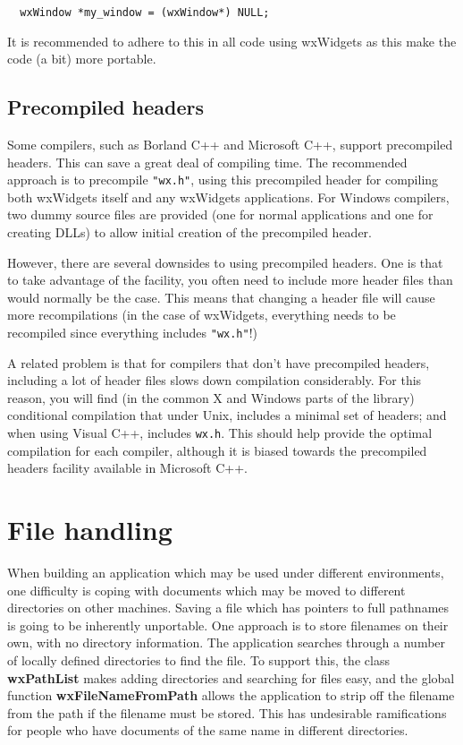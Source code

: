 {\small
\begin{verbatim}
  wxWindow *my_window = (wxWindow*) NULL;
\end{verbatim}
}%

It is recommended to adhere to this in all code using wxWidgets as
this make the code (a bit) more portable.

\subsection{Precompiled headers}\label{precompiledheaders}

Some compilers, such as Borland C++ and Microsoft C++, support
precompiled headers. This can save a great deal of compiling time. The
recommended approach is to precompile {\tt "wx.h"}, using this
precompiled header for compiling both wxWidgets itself and any
wxWidgets applications. For Windows compilers, two dummy source files
are provided (one for normal applications and one for creating DLLs)
to allow initial creation of the precompiled header.

However, there are several downsides to using precompiled headers. One
is that to take advantage of the facility, you often need to include
more header files than would normally be the case. This means that
changing a header file will cause more recompilations (in the case of
wxWidgets, everything needs to be recompiled since everything includes {\tt "wx.h"}!)

A related problem is that for compilers that don't have precompiled
headers, including a lot of header files slows down compilation
considerably. For this reason, you will find (in the common
X and Windows parts of the library) conditional
compilation that under Unix, includes a minimal set of headers;
and when using Visual C++, includes {\tt wx.h}. This should help provide
the optimal compilation for each compiler, although it is
biased towards the precompiled headers facility available
in Microsoft C++.

\section{File handling}\label{filehandling}

When building an application which may be used under different
environments, one difficulty is coping with documents which may be
moved to different directories on other machines. Saving a file which
has pointers to full pathnames is going to be inherently unportable. One
approach is to store filenames on their own, with no directory
information.  The application searches through a number of locally
defined directories to find the file. To support this, the class {\bf
wxPathList} makes adding directories and searching for files easy, and
the global function {\bf wxFileNameFromPath} allows the application to
strip off the filename from the path if the filename must be stored.
This has undesirable ramifications for people who have documents of the
same name in different directories.


